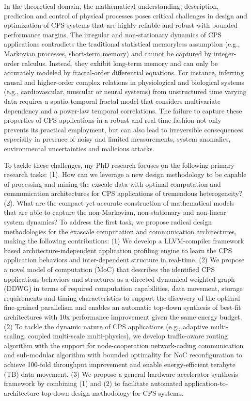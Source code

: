 In the theoretical domain, the mathematical understanding, description, prediction and control of physical processes poses critical challenges in design and optimization of CPS systems that are highly reliable and robust with bounded performance margins. The irregular and non-stationary dynamics of CPS applications contradicts the traditional statistical memoryless assumption (e.g., Markovian processes, short-term memory) and cannot be captured by integer-order calculus. Instead, they exhibit long-term memory and can only be accurately modeled by fractal-order differential equations. For instance, inferring causal and higher-order complex relations in physiological and biological systems (e.g., cardiovascular, muscular or neural systems) from unstructured time varying data requires a spatio-temporal fractal model that considers multivariate dependency and a power-law temporal correlations. The failure to capture these properties of CPS applications in a robust and real-time fashion not only prevents its practical employment, but can also lead to irreversible consequences especially in presence of noisy and limited measurements, system anomalies, environmental uncertainties and malicious attacks. 

To tackle these challenges, my PhD research focuses on the following primary research tasks:
(1). How can we leverage a new design methodology to be capable of processing and mining the exscale data with optimal computation and communication architectures for CPS applications of tremendous heterogeneity? 
(2). What are the compact yet accurate construction of mathematical models that are able to capture the non-Markovian, non-stationary and non-linear system dynamics? 
To address the first task, we propose radical design methodologies for the exascale computation and communication architectures, making the following contributions: (1) We develop a LLVM-compiler framework based architecture-independent application profiling engine to learn the CPS application behaviors and inter-dependent structure in real-time. (2) We propose a novel model of computation (MoC) that describes the identified CPS applications behaviors and structures as a directed dynamical weighted graph (DDWG) in terms of required computation capabilities, data movement, storage requirements and timing characteristics to support the discovery of the optimal fine-grained parallelism and enables an automatic top-down synthesis of best-fit architectures with 10x performance improvement given the same energy budget. (2) To tackle the dynamic nature of CPS applications (e.g., adaptive multi-scaling, coupled multi-scale multi-physics), we develop traffic-aware routing algorithm with the support for node-cooperation network-coding communication and sub-modular algorithm with bounded optimality for NoC reconfiguration to achieve 100-fold throughput improvement and enable energy-efficient terabyte (TB) data movement. (3) We propose a general hardware accelerator synthesis framework by combining (1) and (2) to facilitate automated application-to-architecture top-down design methodology for CPS systems.


